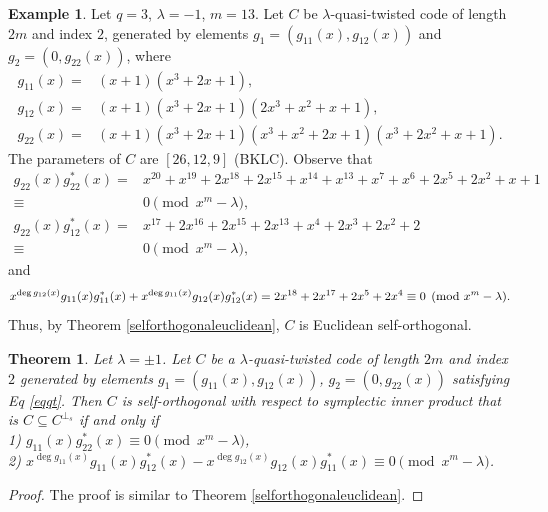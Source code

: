 \documentclass[12 pt]{extarticle}
\numberwithin{equation}{section}
\newtheorem{theorem}{Theorem}[section]
\theoremstyle{definition}
\newtheorem{example}{Example}[section]
\begin{document}
\begin{example}
Let $q=3$, $\lambda=-1$, $m=13$.   Let $C$ be $\lambda$-quasi-twisted code of length $2m$ and index $2$, generated by elements $g_1=(g_{11}(x),g_{12}(x))$ and $g_2=(0,g_{22}(x))$, where
\begin{equation*}
    \begin{split}
       g_{11}(x)=&(x+1)(x^3+2x+1),\\
       g_{12}(x)=&(x+1)(x^3+2x+1)(2x^3 + x^2 + x + 1),\\
       g_{22}(x)=&(x+1)(x^3+2x+1)(x^3+x^2+2x+1)(x^3+2x^2+x+1). 
    \end{split}
\end{equation*}
The parameters of $C$ are $[26,12,9]$ (BKLC).
Observe that  
\begin{align*}
     g_{22}(x)g_{22}^*(x)=&x^{20} + x^{19} + 2x^{18} + 2x^{15} + x^{14} + x^{13} + x^7 + x^6 + 2x^5 + 2x^2
    + x + 1\\
    \equiv& 0\pmod{x^m-\lambda},\\
 g_{22}(x)g_{12}^*(x)=&x^{17} + 2x^{16} + 2x^{15} + 2x^{13} + x^4 + 2x^3 + 2x^2 + 2\\
 \equiv& 0\pmod{x^m-\lambda},
\end{align*}
and 
$$x^{\deg g_{12}(x)} g_{11}(x)g_{11}^*(x)+x^{\deg g_{11}(x)}g_{12}(x)g_{12}^*(x)=2x^{18} + 2x^{17} + 2x^5 + 2x^4\\\equiv 0\pmod{x^m-\lambda}.$$
Thus, by Theorem \ref{selforthogonaleuclidean}, $C$ is Euclidean self-orthogonal.
\end{example}


\begin{theorem}\label{selfsym}
 Let $\lambda=\pm 1$. Let $C$ be a $\lambda$-quasi-twisted code of length $2m$ and index $2$ generated by elements $g_1=(g_{11}(x),g_{12}(x))$, $g_2=(0,g_{22}(x))$ satisfying Eq \ref{eqqt}. Then $C$ is self-orthogonal with respect to symplectic inner product that is $C\subseteq C^{\perp_s}$ if and only if \\
1) $g_{11}(x)g_{22}^*(x)\equiv 0\pmod{x^m-\lambda}$,\\
   2)  $x^{\deg g_{11}(x)} g_{11}(x)g_{12}^*(x)-x^{\deg g_{12}(x)}g_{12}(x)g_{11}^*(x)\equiv 0\pmod{x^m-\lambda}$.
\end{theorem}
\begin{proof}
    The proof is similar to Theorem \ref{selforthogonaleuclidean}.
\end{proof}
\end{document}
